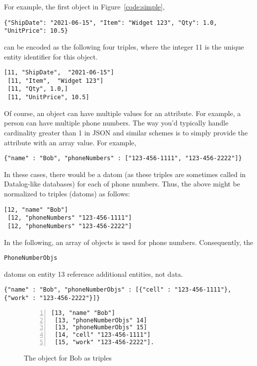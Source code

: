 \documentclass[9pt,letterpaper]{article}
\newcommand{\stt}[1]{\begin{footnotesize}\texttt{#1}\end{footnotesize}}
\begin{document}
For example, the first object in Figure~\ref{code:simple}, \stt{\{"ShipDate":  "2021-06-15", "Item":  "Widget 123", "Qty": 1.0, "UnitPrice": 10.5\}} can be encoded as
the following four triples, where the integer 11 is the unique entity identifier for this object.

\begin{lstlisting}[basicstyle=\ttfamily\scriptsize]
 [11, "ShipDate",  "2021-06-15"]
 [11, "Item",  "Widget 123"]
 [11, "Qty", 1.0,]
 [11, "UnitPrice", 10.5]
\end{lstlisting}

Of course, an object can have multiple values for an attribute.
For example, a person can have multiple phone numbers.
The way you'd typically handle cardinality greater than 1 in JSON and similar schemes is to simply provide the attribute with an array value.
For example,

\begin{lstlisting}[basicstyle=\ttfamily\scriptsize]
 {"name" : "Bob", "phoneNumbers" : ["123-456-1111", "123-456-2222"]}
\end{lstlisting}

In these cases, there would be a datom (as these triples are sometimes called in Datalog-like databases) for each of phone numbers.
Thus, the above might be normalized to triples (datoms) as follows:

\begin{lstlisting}[basicstyle=\ttfamily\scriptsize]
 [12, "name" "Bob"]
 [12, "phoneNumbers" "123-456-1111"]
 [12, "phoneNumbers" "123-456-2222"]
\end{lstlisting}

In the following, an array of objects is used for phone numbers.
Consequently, the \stt{PhoneNumberObjs} datoms on entity 13 reference additional entities, not data.

\begin{lstlisting}[basicstyle=\ttfamily\scriptsize]
{"name" : "Bob", "phoneNumberObjs" : [{"cell" : "123-456-1111"}, {"work" : "123-456-2222"}]}
\end{lstlisting}

\begin{figure}[H]
  \caption{The object for Bob as triples}
  \label{code:bob-phone}
\begin{lstlisting}[numberstyle=\scriptsize,basicstyle=\ttfamily\scriptsize,numbers=left,stepnumber=1,breaklines=true]
 [13, "name" "Bob"]
 [13, "phoneNumberObjs" 14]
 [13, "phoneNumberObjs" 15]
 [14, "cell" "123-456-1111"]
 [15, "work" "123-456-2222"].
\end{lstlisting}
\end{figure}
\end{document}
